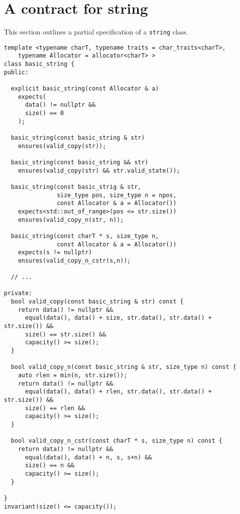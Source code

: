 \section{A contract for string}

This section outlines a partial specification of a \texttt{string} class.

\begin{lstlisting}
template <typename charT, typename traits = char_traits<charT>,
    typename Allocator = allocator<charT> >
class basic_string {
public:

  explicit basic_string(const Allocator & a)
    expects(
      data() != nullptr &&
      size() == 0
    );

  basic_string(const basic_string & str)
    ensures(valid_copy(str));

  basic_string(const basic_string && str)
    ensures(valid_copy(str) && str.valid_state());

  basic_string(const basic_strig & str,
               size_type pos, size_type n = npos,
               const Allocator & a = Allocator())
    expects<std::out_of_range>(pos <= str.size())
    ensures(valid_copy_n(str, n));

  basic_string(const charT * s, size_type n,
               const Allocator & a = Allocator())
    expects(s != nullptr)
    ensures(valid_copy_n_cstr(s,n));

  // ...

private:
  bool valid_copy(const basic_string & str) const {
    return data() != nullptr &&
      equal(data(), data() + size, str.data(), str.data() + str.size()) &&
      size() == str.size() &&
      capacity() >= size();
  }

  bool valid_copy_n(const basic_string & str, size_type n) const {
    auto rlen = min(n, str.size());
    return data() != nullptr &&
      equal(data(), data() + rlen, str.data(), str.data() + str.size()) &&
      size() == rlen &&
      capacity() >= size();
  }

  bool valid_copy_n_cstr(const charT * s, size_type n) const {
    return data() != nullptr &&
      equal(data(), data() + n, s, s+n) &&
      size() == n &&
      capacity() >= size();
  }

}
invariant(size() <= capacity());

\end{lstlisting}
